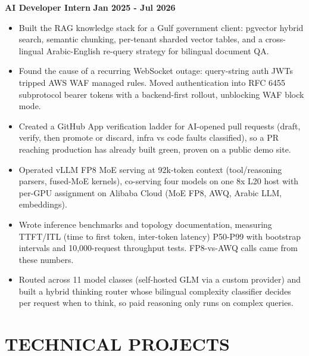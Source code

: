 \documentclass[10pt,a4paper]{article}
\newcommand{\dates}[1]{\hfill {\bfseries #1}}
\begin{document}
\medskip
{\bfseries AI Developer Intern} \dates{Jan 2025 - Jul 2026}
\begin{itemize}
  \item Built the RAG knowledge stack for a Gulf government client: pgvector hybrid search,
  semantic chunking, per-tenant sharded vector tables, and a cross-lingual Arabic-English re-query
  strategy for bilingual document QA.
  \item Found the cause of a recurring WebSocket outage: query-string auth JWTs tripped AWS WAF
  managed rules. Moved authentication into RFC 6455 subprotocol bearer tokens with a
  backend-first rollout, unblocking WAF block mode.
  \item Created a GitHub App verification ladder for AI-opened pull requests (draft, verify, then
  promote or discard, infra vs code faults classified), so a PR reaching production has already
  built green, proven on a public demo site.
  \item Operated vLLM FP8 MoE serving at 92k-token context (tool/reasoning parsers, fused-MoE
  kernels), co-serving four models on one 8x L20 host with per-GPU assignment on Alibaba Cloud (MoE
  FP8, AWQ, Arabic LLM, embeddings).
  \item Wrote inference benchmarks and topology documentation, measuring TTFT/ITL (time to
  first token, inter-token latency) \mbox{P50-P99} with bootstrap intervals and 10,000-request
  throughput tests. FP8-vs-AWQ calls came from these numbers.
  \item Routed across 11 model classes (self-hosted GLM via a custom provider) and built a
  hybrid thinking router whose bilingual complexity classifier decides per request when to think,
  so paid reasoning only runs on complex queries.
\end{itemize}

\section*{TECHNICAL PROJECTS}
\end{document}
